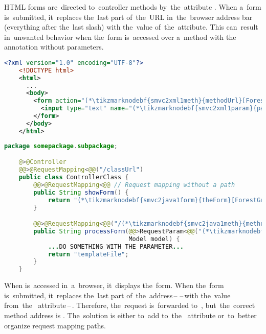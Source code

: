 \warning HTML forms are~directed to~controller methods by~the~attribute .
When a~form is~submitted, it~replaces the~last part of~the~URL in~the~browser address bar (everything after the~last slash) with the~value of~the~attribute.
This can~result in~unwanted behavior when the~form is~accessed over a~method with the~ annotation without parameters.
\newpage

\begin{lstlisting}[language=XML, title={Simple HTML form \tikzmarknodebf{smvc2xml1form}{\textit{theForm}}\textit{.html}}]
    <?xml version="1.0" encoding="UTF-8"?>
    <!DOCTYPE html>
    <html>
      ...
      <body>
        <form action="(*\tikzmarknodebf{smvc2xml1meth}{methodUrl}[ForestGreen]*)" method="post">
          <input type="text" name="(*\tikzmarknodebf{smvc2xml1param}{paramKey}[ForestGreen]*)">
        </form>
      </body>
    </html>
\end{lstlisting}
\begin{lstlisting}[language=Java, title={Controller class}]
    package somepackage.subpackage;

    @>@Controller
    @@>@RequestMapping<@@("/classUrl")
    public class ControllerClass {
        @@>@RequestMapping<@@ // Request mapping without a path
        public String showForm() {
            return "(*\tikzmarknodebf{smvc2java1form}{theForm}[ForestGreen]*)"
        }

        @@>@RequestMapping<@@("/(*\tikzmarknodebf{smvc2java1meth}{methodUrl}[ForestGreen]*)")
        public String processForm(@@>RequestParam<@@("(*\tikzmarknodebf{smvc2java1param}{paramKey}[ForestGreen]*)") String singleParameter,
                                  Model model) {
            ...DO SOMETHING WITH THE PARAMETER...
            return "templateFile";
        }
    }
\end{lstlisting}

\noindent When  is~accessed in~a~browser, it~displays the~form.
When the~form is~submitted, it~replaces the~last part of~the~address\,--\,\,--\,with the~value from~the~ attribute\,--\,.
Therefore, the~request is~forwarded to~, but~the~correct method address is .
The~solution is either to~add  to~the~ attribute or~to~better organize request mapping paths.
\newpage

